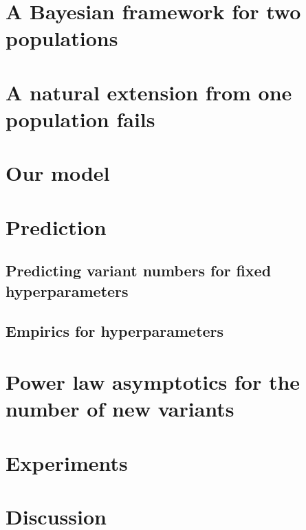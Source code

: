 \documentclass[ba]{imsart}
\numberwithin{equation}{section}
\theoremstyle{plain}
\begin{document}
\section{A Bayesian framework for two populations}
\label{sec:bnp_two_pops}


\section{A natural extension from one population fails}
\label{sec:cant_have_it_all}


\section{Our model}
\label{sec:our_model} %
 

\section{Prediction} 
\label{sec:prediction_all}


	\subsection{Predicting variant numbers for fixed hyperparameters}
	\label{sec:prediction_fixed}
	
	
	\subsection{Empirics for hyperparameters}
	\label{sec:hyperparameter_empirics}
	

\section{Power law asymptotics for the number of new variants}
\label{sec:powerlaw}


\section{Experiments}
\label{sec:experiments}


\section{Discussion}
\label{sec:discussion}

\end{document}
